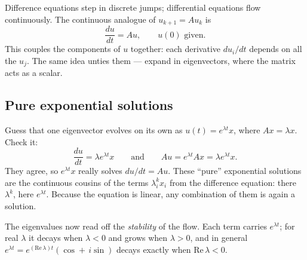 Difference equations step in discrete jumps; differential equations flow continuously. The continuous analogue of $u_{k+1}=Au_k$ is
\[
   \frac{du}{dt}=Au,
   \qquad u(0)\text{ given}.
\]
This couples the components of $u$ together: each derivative $du_i/dt$ depends on all the $u_j$. The same idea unties them --- expand in eigenvectors, where the matrix acts as a scalar.

\subsection{Pure exponential solutions}

Guess that one eigenvector evolves on its own as $u(t)=e^{\lambda t}x$, where $Ax=\lambda x$. Check it:
\[
   \frac{du}{dt}=\lambda e^{\lambda t}x
   \qquad\text{and}\qquad
   Au=e^{\lambda t}Ax=\lambda e^{\lambda t}x .
\]
They agree, so $e^{\lambda t}x$ really solves $du/dt=Au$. These ``pure'' exponential solutions are the continuous cousins of the terms $\lambda_i^k x_i$ from the difference equation: there $\lambda^k$, here $e^{\lambda t}$. Because the equation is linear, any combination of them is again a solution.


The eigenvalues now read off the \emph{stability} of the flow. Each term carries $e^{\lambda t}$; for real $\lambda$ it decays when $\lambda<0$ and grows when $\lambda>0$, and in general $e^{\lambda t}=e^{(\mathrm{Re}\,\lambda)t}(\cos+\,i\sin)$ decays exactly when $\mathrm{Re}\,\lambda<0$.


